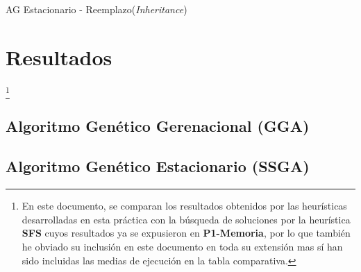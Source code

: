 \documentclass[a4paper, 11pt]{article}
\begin{document}
			\begin{algorithm}[H]
				\begin{algorithmic}[1]
				\REQUIRE \ \\
						 \
						
						\ENDIF
					\ENDFOR
					
							\ENDIF
						\ENDIF
						
					\ENDWHILE
				\ENDWHILE
				\end{algorithmic}
			\caption{AG Estacionario - Reemplazo(\textit{Inheritance})}
			\label{SSGA-Inher}
			\end{algorithm}
			
		
	\section{Resultados}\footnote{En este documento, se comparan los resultados obtenidos por las
	heurísticas desarrolladas en esta práctica con la búsqueda de soluciones por la heurística
	\textbf{SFS} cuyos resultados ya se expusieron en \textbf{P1-Memoria}, por lo que también he
	obviado su inclusión en este documento en toda su extensión mas sí han sido incluidas las medias
	de ejecución en la tabla comparativa.}
		\subsection{Algoritmo Genético Gerenacional (\textbf{GGA})}
			
			
			
		\subsection{Algoritmo Genético Estacionario (\textbf{SSGA})}
			
			
			
			
\end{document}
